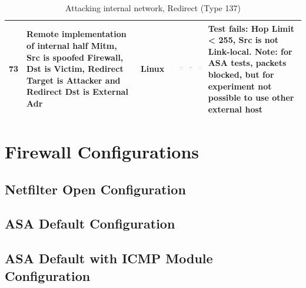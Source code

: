\documentclass[12pt]{article}
\begin{document}
\begin{savenotes}
\begin{table}[!h]
{{\begin{tabular}{|C{1.0cm}|L{6.0cm}|C{1.5cm}|C{1.0cm}|C{1.0cm}|C{1.0cm}|C{1.0cm}|L{7.0cm}|}
73&Remote implementation of internal half Mitm, Src is spoofed Firewall, Dst is Victim, Redirect Target is Attacker and Redirect Dst is External Adr&Linux&\includegraphics[width=4mm, height=4mm]{ok}&\includegraphics[width=4mm, height=4mm]{notok}&\includegraphics[width=4mm, height=4mm]{notok}&\includegraphics[width=4mm, height=4mm]{notok}&Test fails: Hop Limit < 255, Src is not Link-local. Note: for ASA tests, packets blocked, but for experiment not possible to use other external host\\
\hline
\end{tabular}}}
\caption{Attacking internal network, Redirect (Type 137)}
\label{table:attackInternalResults12}
\end{table}
\end{savenotes}

\clearpage

\pagebreak

\section{Firewall Configurations}
\label{Appendix 5}

\subsection{Netfilter Open Configuration}
\label{appendix:netfilterOpenApp}



\subsection{ASA Default Configuration}
\label{appendix:ASAdefaultAppendix}




\subsection{ASA Default with ICMP Module Configuration}
\label{appendix:ASAicmpAppendix}
\end{document}
